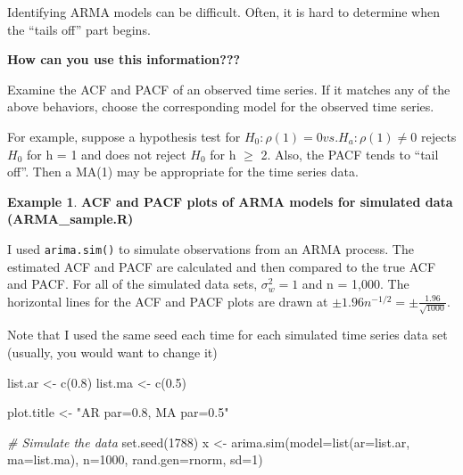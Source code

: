 \documentclass[
]{book}
\newenvironment{Shaded}{\begin{snugshade}}{\end{snugshade}}
\newcommand{\AttributeTok}[1]{\textcolor[rgb]{0.77,0.63,0.00}{#1}}
\newcommand{\CommentTok}[1]{\textcolor[rgb]{0.56,0.35,0.01}{\textit{#1}}}
\newcommand{\DecValTok}[1]{\textcolor[rgb]{0.00,0.00,0.81}{#1}}
\newcommand{\FloatTok}[1]{\textcolor[rgb]{0.00,0.00,0.81}{#1}}
\newcommand{\FunctionTok}[1]{\textcolor[rgb]{0.00,0.00,0.00}{#1}}
\newcommand{\NormalTok}[1]{#1}
\newcommand{\OtherTok}[1]{\textcolor[rgb]{0.56,0.35,0.01}{#1}}
\newcommand{\StringTok}[1]{\textcolor[rgb]{0.31,0.60,0.02}{#1}}
\theoremstyle{definition}
\theoremstyle{definition}
\newtheorem{example}{Example}[chapter]
\theoremstyle{definition}
\theoremstyle{definition}
\theoremstyle{remark}
\begin{document}
Identifying ARMA models can be difficult. Often, it is hard to determine when the ``tails off'' part begins.

\textbf{How can you use this information???}

Examine the ACF and PACF of an observed time series. If it matches any of the above behaviors, choose the corresponding model for the observed time series.

For example, suppose a hypothesis test for \(H_0:\rho(1) = 0 vs. H_a:\rho(1) \ne 0\) rejects \(H_0\) for h = 1 and does not reject \(H_0\) for h \(\ge\) 2. Also, the PACF tends to ``tail off''. Then a MA(1) may be appropriate for the time series data.

\begin{example}
\textbf{ACF and PACF plots of ARMA models for simulated data (ARMA\_sample.R)}

I used \texttt{arima.sim()} to simulate observations from an ARMA process. The estimated ACF and PACF are calculated and then compared to the true ACF and PACF. For all of the simulated data sets, \(\sigma_w^2=1\) and n = 1,000. The horizontal lines for the ACF and PACF plots are drawn at \(\pm 1.96n^{-1/2}=\pm \frac{1.96}{\sqrt{1000}}\).

Note that I used the same seed each time for each simulated time series data set (usually, you would want to change it)

\begin{Shaded}
\begin{Highlighting}[]
\NormalTok{list.ar }\OtherTok{\textless{}{-}} \FunctionTok{c}\NormalTok{(}\FloatTok{0.8}\NormalTok{)}
\NormalTok{list.ma }\OtherTok{\textless{}{-}} \FunctionTok{c}\NormalTok{(}\FloatTok{0.5}\NormalTok{)}

\NormalTok{plot.title }\OtherTok{\textless{}{-}} \StringTok{"AR par=0.8, MA par=0.5"}
\end{Highlighting}
\end{Shaded}

\begin{Shaded}
\begin{Highlighting}[]
\CommentTok{\# Simulate the data}
\FunctionTok{set.seed}\NormalTok{(}\DecValTok{1788}\NormalTok{)}
\NormalTok{x }\OtherTok{\textless{}{-}} \FunctionTok{arima.sim}\NormalTok{(}\AttributeTok{model=}\FunctionTok{list}\NormalTok{(}\AttributeTok{ar=}\NormalTok{list.ar, }\AttributeTok{ma=}\NormalTok{list.ma), }\AttributeTok{n=}\DecValTok{1000}\NormalTok{, }\AttributeTok{rand.gen=}\NormalTok{rnorm, }\AttributeTok{sd=}\DecValTok{1}\NormalTok{)}


\end{Highlighting}
\end{Shaded}
\end{example}
\end{document}
